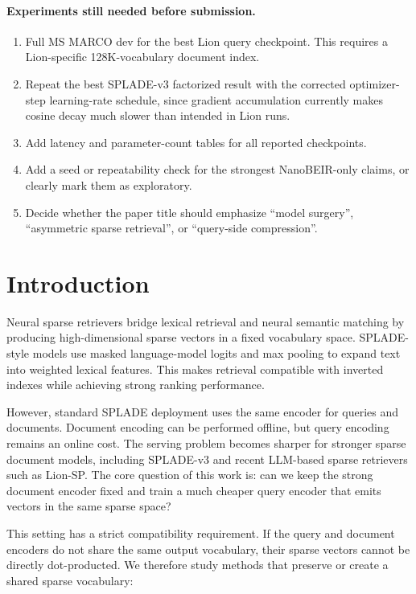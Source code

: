 \documentclass[
]{ceurart}
\begin{document}
\paragraph{Experiments still needed before submission.}
\begin{enumerate}
  \item Full MS MARCO dev for the best Lion query checkpoint. This requires a
  Lion-specific 128K-vocabulary document index.
  \item Repeat the best SPLADE-v3 factorized result with the corrected
  optimizer-step learning-rate schedule, since gradient accumulation currently
  makes cosine decay much slower than intended in Lion runs.
  \item Add latency and parameter-count tables for all reported checkpoints.
  \item Add a seed or repeatability check for the strongest NanoBEIR-only
  claims, or clearly mark them as exploratory.
  \item Decide whether the paper title should emphasize ``model surgery'',
  ``asymmetric sparse retrieval'', or ``query-side compression''.
\end{enumerate}

\section{Introduction}

Neural sparse retrievers bridge lexical retrieval and neural semantic matching
by producing high-dimensional sparse vectors in a fixed vocabulary space.
SPLADE-style models \cite{Formal2021SPLADE,Formal2022SPLADEv2} use masked
language-model logits and max pooling to expand text into weighted lexical
features. This makes retrieval compatible with inverted indexes while achieving
strong ranking performance.

However, standard SPLADE deployment uses the same encoder for queries and
documents. Document encoding can be performed offline, but query encoding
remains an online cost. The serving problem becomes sharper for stronger sparse
document models, including SPLADE-v3 \cite{Lassance2024SPLADEv3} and recent
LLM-based sparse retrievers such as Lion-SP. The core question of this work is:
can we keep the strong document encoder fixed and train a much cheaper query
encoder that emits vectors in the same sparse space?

This setting has a strict compatibility requirement. If the query and document
encoders do not share the same output vocabulary, their sparse vectors cannot be
directly dot-producted. We therefore study methods that preserve or create a
shared sparse vocabulary:
\end{document}
